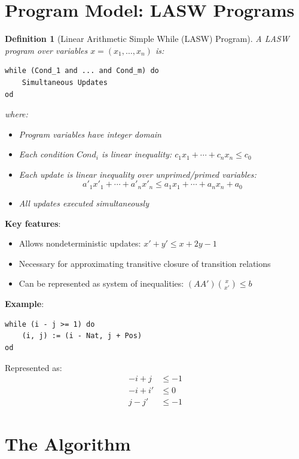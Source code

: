 \documentclass{article}
\newtheorem{definition}{Definition}
\begin{document}
\section{Program Model: LASW Programs}

\begin{definition}[Linear Arithmetic Simple While (LASW) Program]
A LASW program over variables $x = (x_1, \ldots, x_n)$ is:
\begin{verbatim}
while (Cond_1 and ... and Cond_m) do
    Simultaneous Updates
od
\end{verbatim}
where:
\begin{itemize}
    \item Program variables have integer domain
    \item Each condition $Cond_i$ is linear inequality: $c_1 x_1 + \cdots + c_n x_n \leq c_0$
    \item Each update is linear inequality over unprimed/primed variables:
    \begin{equation}
    a'_1 x'_1 + \cdots + a'_n x'_n \leq a_1 x_1 + \cdots + a_n x_n + a_0
    \end{equation}
    \item All updates executed simultaneously
\end{itemize}
\end{definition}

\textbf{Key features}:
\begin{itemize}
    \item Allows nondeterministic updates: $x' + y' \leq x + 2y - 1$
    \item Necessary for approximating transitive closure of transition relations
    \item Can be represented as system of inequalities: $(A A') \binom{x}{x'} \leq b$
\end{itemize}

\textbf{Example}:
\begin{verbatim}
while (i - j >= 1) do
    (i, j) := (i - Nat, j + Pos)
od
\end{verbatim}

Represented as:
\begin{align}
-i + j &\leq -1\\
-i + i' &\leq 0\\
j - j' &\leq -1
\end{align}

\section{The Algorithm}
\end{document}
